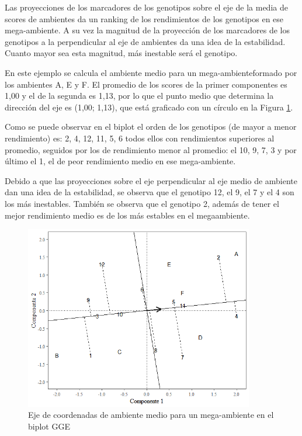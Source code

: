 Las proyecciones de los marcadores de los genotipos sobre el eje de la media de scores de ambientes da un ranking de los rendimientos de los genotipos en ese mega-ambiente. A su vez la magnitud de la proyección de los marcadores de los genotipos a la perpendicular al eje de ambientes da una idea de la estabilidad. Cuanto mayor sea esta magnitud, más inestable será el genotipo.

En este ejemplo se calcula el ambiente medio para un mega-ambienteformado por los ambientes A, E y F. El promedio de los scores de la primer componentes es 1,00 y el de la segunda es 1,13, por lo que el punto medio que determina la dirección del eje es (1,00; 1,13), que está graficado con un círculo en la Figura \ref{fig:fig316}.

Como se puede observar en el biplot el orden de los genotipos (de mayor a menor rendimiento) es: 2, 4, 12, 11, 5, 6 todos ellos con rendimientos superiores al promedio, seguidos por los de rendimiento menor al promedio: el 10, 9, 7, 3 y por último el 1, el de peor rendimiento medio en ese mega-ambiente.

Debido a que las proyecciones sobre el eje perpendicular al eje medio de ambiente dan una idea de la estabilidad, se observa que el genotipo 12, el 9, el 7 y el 4 son los más inestables. También se observa que el genotipo 2, además de tener el mejor rendimiento medio es de los más estables en el megaambiente.


\begin{figure}[H]
	\begin{center}
		\includegraphics[width=10cm]{./Graficos/mean_stab_GGE.png}
	\end{center}
	\caption{Eje de coordenadas de ambiente medio para un mega-ambiente en el biplot GGE}
	\label{fig:fig316}
\end{figure}



